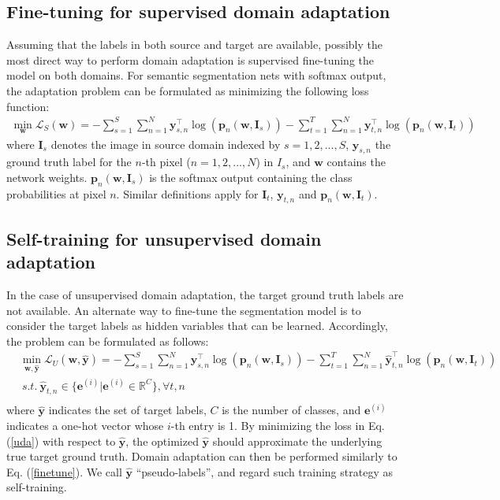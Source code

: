 \documentclass[runningheads]{llncs}
\begin{document}
\subsection{Fine-tuning for supervised domain adaptation}
Assuming that the labels in both source and target are available, possibly the most direct way to perform domain adaptation is supervised fine-tuning the model on both domains. For semantic segmentation nets with softmax output, the adaptation problem can be formulated as minimizing the following loss function:
\begin{equation}
\begin{aligned}\label{finetune}
\min_{\mathbf{w}}\mathcal{L}_S(\mathbf{w})
= -\sum_{s=1}^{S}\sum_{n=1}^{N}\mathbf{y}_{s,n}^\top\log (\mathbf{p}_n(\mathbf{w},\mathbf{I}_s)) -\sum_{t=1}^{T}\sum_{n=1}^{N}\mathbf{y}_{t,n}^\top\log (\mathbf{p}_n(\mathbf{w},\mathbf{I}_t))
\end{aligned}
\end{equation}
where $\mathbf{I}_s$ denotes the image in source domain indexed by $s = 1,2,...,S$, $\mathbf{y}_{s,n}$ the ground truth label for the $n$-th pixel ($n = 1,2,...,N$) in $I_s$, and $\mathbf{w}$ contains the network weights. $\mathbf{p}_n(\mathbf{w},\mathbf{I}_s)$ is the softmax output containing the class probabilities at pixel $n$. Similar definitions apply for $\mathbf{I}_t$, $\mathbf{y}_{t,n}$ and $\mathbf{p}_n(\mathbf{w},\mathbf{I}_t)$.

\subsection{Self-training for unsupervised domain adaptation}
In the case of unsupervised domain adaptation, the target ground truth labels are not available. An alternate way to fine-tune the segmentation model is to consider the target labels as hidden variables that can be learned. Accordingly, the problem can be formulated as follows:
\begin{equation}\label{uda}
\begin{aligned}
& \min_{\mathbf{w},\hat{\mathbf{y}}}\mathcal{L}_{U}(\mathbf{w},\hat{\mathbf{y}}) = -\sum_{s=1}^{S}\sum_{n=1}^{N}\mathbf{y}_{s,n}^\top\log (\mathbf{p}_n(\mathbf{w},\mathbf{I}_s)) - \sum_{t=1}^{T}\sum_{n=1}^{N}\hat{\mathbf{y}}_{t,n}^\top\log (\mathbf{p}_n(\mathbf{w},\mathbf{I}_t))\\
& ~s.t. ~ \hat{\mathbf{y}}_{t,n} \in \{\mathbf{e}^{(i)}|\mathbf{e}^{(i)} \in \mathbb{R}^C\}, \forall t,n\\
\end{aligned}
\end{equation}
where $\hat{\mathbf{y}}$ indicates the set of target labels, $C$ is the number of classes, and $\mathbf{e}^{(i)}$ indicates a one-hot vector whose $i$-th entry is 1. By minimizing the loss in Eq. (\ref{uda}) with respect to $\hat{\mathbf{y}}$, the optimized $\hat{\mathbf{y}}$ should approximate the underlying true target ground truth. Domain adaptation can then be performed similarly to Eq. (\ref{finetune}). We call $\hat{\mathbf{y}}$ ``pseudo-labels'', and regard such training strategy as self-training.
\end{document}
